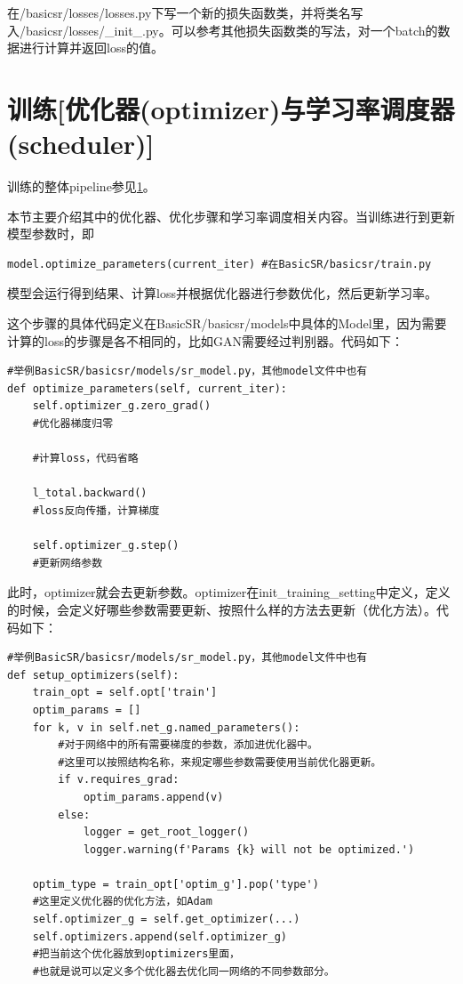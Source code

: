\documentclass[../main.tex]{subfiles}
\begin{document}
在/basicsr/losses/losses.py下写一个新的损失函数类，并将类名写入/basicsr/losses/\_init\_.py。可以参考其他损失函数类的写法，对一个batch的数据进行计算并返回loss的值。

\section{训练[优化器(optimizer)与学习率调度器(scheduler)]}

\begin{note} %
	训练的整体pipeline参见\ref{}。
\end{note}

本节主要介绍其中的优化器、优化步骤和学习率调度相关内容。当训练进行到更新模型参数时，即
\begin{verbatim}
model.optimize_parameters(current_iter) #在BasicSR/basicsr/train.py
\end{verbatim}

模型会运行得到结果、计算loss并根据优化器进行参数优化，然后更新学习率。

这个步骤的具体代码定义在BasicSR/basicsr/models中具体的Model里，因为需要计算的loss的步骤是各不相同的，比如GAN需要经过判别器。代码如下：

\begin{verbatim}
#举例BasicSR/basicsr/models/sr_model.py，其他model文件中也有
def optimize_parameters(self, current_iter):
    self.optimizer_g.zero_grad()
    #优化器梯度归零

    #计算loss，代码省略
    
    l_total.backward()
    #loss反向传播，计算梯度
    
    self.optimizer_g.step()
    #更新网络参数
\end{verbatim}

此时，optimizer就会去更新参数。optimizer在init\_training\_setting中定义，定义的时候，会定义好哪些参数需要更新、按照什么样的方法去更新（优化方法）。代码如下：

\begin{verbatim}
#举例BasicSR/basicsr/models/sr_model.py，其他model文件中也有
def setup_optimizers(self):
    train_opt = self.opt['train']
    optim_params = []
    for k, v in self.net_g.named_parameters():
        #对于网络中的所有需要梯度的参数，添加进优化器中。
        #这里可以按照结构名称，来规定哪些参数需要使用当前优化器更新。
        if v.requires_grad:
            optim_params.append(v)
        else:
            logger = get_root_logger()
            logger.warning(f'Params {k} will not be optimized.')

    optim_type = train_opt['optim_g'].pop('type')
    #这里定义优化器的优化方法，如Adam
    self.optimizer_g = self.get_optimizer(...)
    self.optimizers.append(self.optimizer_g)
    #把当前这个优化器放到optimizers里面，
    #也就是说可以定义多个优化器去优化同一网络的不同参数部分。
\end{verbatim}
\end{document}
